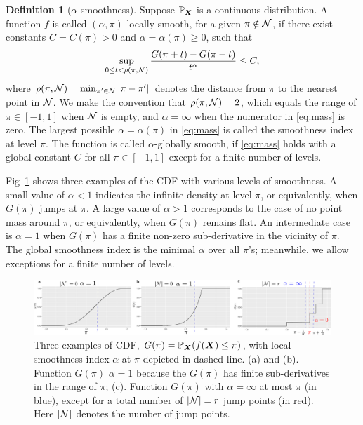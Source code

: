 \documentclass[aos]{imsart}
\theoremstyle{definition}
\newtheorem{definition}{Definition}
\begin{document}
\begin{definition} [$\alpha$-smoothness] \label{ass:decboundary} 
Suppose $\mathbb{P}_{\bm X}$ is a continuous distribution. A function $f$ is called $(\alpha,\pi)$-locally smooth, for a given $\pi \notin \mathcal{N}$, if there exist constants $C=C(\pi)>0$ and $\alpha=\alpha(\pi)\geq 0$, such that
\begin{equation}\label{eq:mass}
\sup_{0\leq t<\rho(\pi, \tN)}{G(\pi+t)-G(\pi-t)\over t^{\alpha}}\leq C,
\end{equation}
where $\rho(\pi,\mathcal{N}) = \min_{\pi'\in \mathcal{N}} |\pi-\pi'|$ denotes the distance from $\pi$ to the nearest point in $\mathcal{N}$. We make the convention that $\rho(\pi,\mathcal{N})=2$, which equals the range of $\pi\in[-1,1]$ when $\mathcal{N}$ is empty, and $\alpha=\infty$ when the numerator in \eqref{eq:mass} is zero. The largest possible $\alpha=\alpha(\pi)$ in \eqref{eq:mass} is called the smoothness index at level $\pi$. The function is called $\alpha$-globally smooth, if \eqref{eq:mass} holds with a global constant $C$ for all $\pi\in[-1,1]$ except for a finite number of levels.
\end{definition}

\noindent
Fig~\ref{fig:CDF} shows three examples of the CDF with various levels of smoothness. A small value of $\alpha<1$ indicates the infinite density at level $\pi$, or equivalently, when $G(\pi)$ jumps at $\pi$. A large value of $\alpha>1$ corresponds to the case of no point mass around $\pi$, or equivalently, when $G(\pi)$ remains flat. An intermediate case is $\alpha=1$ when $G(\pi)$ has a finite non-zero sub-derivative in the vicinity of $\pi$. The global smoothness index is the minimal $\alpha$ over all $\pi$'s; meanwhile, we allow exceptions for a finite number of levels. 

\begin{figure}
\includegraphics[width=.95\textwidth]{figure/cdf_new.pdf}
\caption{Three examples of CDF, $G(\pi)=\mathbb{P}_{\bm X}(f(\bm X)\leq \pi)$, with local smoothness index $\alpha$ at $\pi$ depicted in dashed line. (a) and (b). Function $G(\pi)$ $\alpha=1$ because the $G(\pi)$ has finite sub-derivatives in the range of $\pi$; (c). Function $G(\pi)$ with $\alpha=\infty$ at most $\pi$ (in blue), except for a total number of $|\mathcal{N}|=r$ jump points (in red). Here $|\mathcal{N}|$ denotes the number of jump points.}
\label{fig:CDF}
\end{figure}
\end{document}
